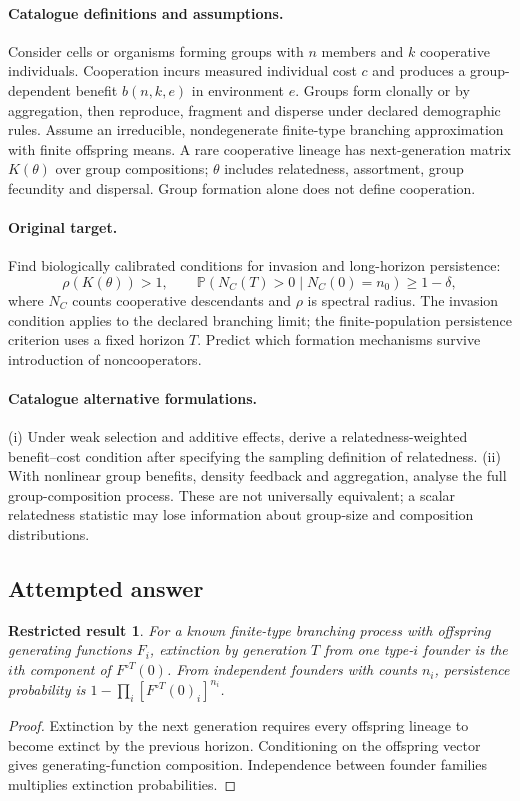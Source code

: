 \documentclass[11pt]{article}
\newcommand{\Prob}{\mathbb P}
\providecommand{\Prob}{\mathbb P}
\newtheorem{attemptresult}{Restricted result}[section]
\begin{document}
\paragraph{Catalogue definitions and assumptions.}
Consider cells or organisms forming groups with $n$ members and $k$ cooperative individuals. Cooperation incurs measured individual cost $c$ and produces a group-dependent benefit $b(n,k,e)$ in environment $e$. Groups form clonally or by aggregation, then reproduce, fragment and disperse under declared demographic rules. Assume an irreducible, nondegenerate finite-type branching approximation with finite offspring means. A rare cooperative lineage has next-generation matrix $K(\theta)$ over group compositions; $\theta$ includes relatedness, assortment, group fecundity and dispersal. Group formation alone does not define cooperation.
\paragraph{Original target.}
Find biologically calibrated conditions for invasion and long-horizon persistence:
\[
\rho(K(\theta))>1,
\qquad
\Prob(N_C(T)>0\mid N_C(0)=n_0)\geq1-\delta,
\]
where $N_C$ counts cooperative descendants and $\rho$ is spectral radius. The invasion condition applies to the declared branching limit; the finite-population persistence criterion uses a fixed horizon $T$. Predict which formation mechanisms survive introduction of noncooperators.
\paragraph{Catalogue alternative formulations.}
(i) Under weak selection and additive effects, derive a relatedness-weighted benefit--cost condition after specifying the sampling definition of relatedness. (ii) With nonlinear group benefits, density feedback and aggregation, analyse the full group-composition process. These are not universally equivalent; a scalar relatedness statistic may lose information about group-size and composition distributions.
\subsection{Attempted answer}
\begin{attemptresult}
For a known finite-type branching process with offspring generating functions $F_i$, extinction by generation $T$ from one type-$i$ founder is the $i$th component of $F^{\circ T}(0)$. From independent founders with counts $n_i$, persistence probability is $1-\prod_i[F^{\circ T}(0)_i]^{n_i}$.
\end{attemptresult}
\begin{proof}
Extinction by the next generation requires every offspring lineage to become extinct by the previous horizon. Conditioning on the offspring vector gives generating-function composition. Independence between founder families multiplies extinction probabilities.
\end{proof}
\end{document}
